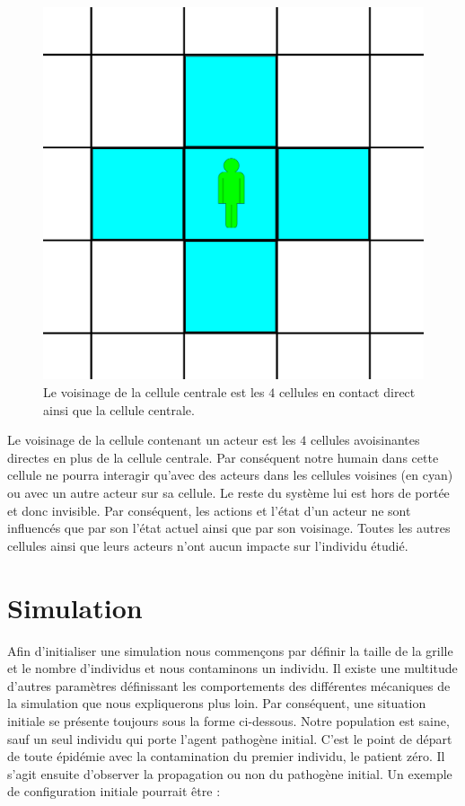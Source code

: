 \begin{figure}[h]
	\centering
	\captionsetup{justification=centering}
	\includegraphics[scale=0.5]{Images/voisinage.png}
	\caption[Voisinage d'une cellule]{Le voisinage de la cellule centrale est les $4$ cellules en contact direct ainsi que la cellule centrale.}
\end{figure}

Le voisinage de la cellule contenant un acteur est les $4$ cellules avoisinantes directes en plus de la cellule centrale. Par conséquent notre humain dans cette cellule ne pourra interagir qu'avec des acteurs dans les cellules voisines (en cyan) ou avec un autre acteur sur sa cellule. Le reste du système lui est hors de portée et donc invisible. Par conséquent, les actions et l'état d'un acteur ne sont influencés que par son l'état actuel ainsi que par son voisinage. Toutes les autres cellules ainsi que leurs acteurs n'ont aucun impacte sur l'individu étudié.

\section{Simulation}

Afin d'initialiser une simulation nous commençons par définir la taille de la grille et le nombre d'individus et nous contaminons un individu. Il existe une multitude d'autres paramètres définissant les comportements des différentes mécaniques de la simulation que nous expliquerons plus loin. Par conséquent, une situation initiale se présente toujours sous la forme ci-dessous. Notre population est saine, sauf un seul individu qui porte l'agent pathogène initial. C'est le point de départ de toute épidémie avec la contamination du premier individu, le patient zéro. Il s'agit ensuite d'observer la propagation ou non du pathogène initial. Un exemple de configuration initiale pourrait être : \\

